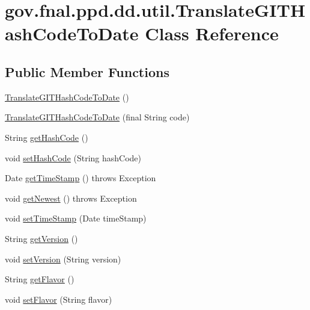 \hypertarget{classgov_1_1fnal_1_1ppd_1_1dd_1_1util_1_1TranslateGITHashCodeToDate}{\section{gov.\-fnal.\-ppd.\-dd.\-util.\-Translate\-G\-I\-T\-Hash\-Code\-To\-Date Class Reference}
\label{classgov_1_1fnal_1_1ppd_1_1dd_1_1util_1_1TranslateGITHashCodeToDate}
}
\subsection*{Public Member Functions}
\begin{DoxyCompactItemize}
\item 
\hyperlink{classgov_1_1fnal_1_1ppd_1_1dd_1_1util_1_1TranslateGITHashCodeToDate_a1f02d5315d989c80fcd1d5eb055fde8e}{Translate\-G\-I\-T\-Hash\-Code\-To\-Date} ()
\item 
\hyperlink{classgov_1_1fnal_1_1ppd_1_1dd_1_1util_1_1TranslateGITHashCodeToDate_a313637f8112acb6a532b8c4f818cedf7}{Translate\-G\-I\-T\-Hash\-Code\-To\-Date} (final String code)
\item 
String \hyperlink{classgov_1_1fnal_1_1ppd_1_1dd_1_1util_1_1TranslateGITHashCodeToDate_a103a33d915679e87ac1f80a2d0842731}{get\-Hash\-Code} ()
\item 
void \hyperlink{classgov_1_1fnal_1_1ppd_1_1dd_1_1util_1_1TranslateGITHashCodeToDate_a6fe4a6f0c0d6a102fa87d3588b17c843}{set\-Hash\-Code} (String hash\-Code)
\item 
Date \hyperlink{classgov_1_1fnal_1_1ppd_1_1dd_1_1util_1_1TranslateGITHashCodeToDate_a579471a2e42dc2cc64b928207d4de457}{get\-Time\-Stamp} ()  throws Exception 
\item 
void \hyperlink{classgov_1_1fnal_1_1ppd_1_1dd_1_1util_1_1TranslateGITHashCodeToDate_abd6899136c0cb2c0d22304f18cd107f3}{get\-Newest} ()  throws Exception 
\item 
void \hyperlink{classgov_1_1fnal_1_1ppd_1_1dd_1_1util_1_1TranslateGITHashCodeToDate_adf8048178fcc5268a5626d523f74c35b}{set\-Time\-Stamp} (Date time\-Stamp)
\item 
String \hyperlink{classgov_1_1fnal_1_1ppd_1_1dd_1_1util_1_1TranslateGITHashCodeToDate_aac0cfb3fc27d10f499c093091b8a2f4d}{get\-Version} ()
\item 
void \hyperlink{classgov_1_1fnal_1_1ppd_1_1dd_1_1util_1_1TranslateGITHashCodeToDate_aa0040b578c3a89616c8c3a314fb149a2}{set\-Version} (String version)
\item 
String \hyperlink{classgov_1_1fnal_1_1ppd_1_1dd_1_1util_1_1TranslateGITHashCodeToDate_ad70da954f52e2ea656323f5e0206d779}{get\-Flavor} ()
\item 
void \hyperlink{classgov_1_1fnal_1_1ppd_1_1dd_1_1util_1_1TranslateGITHashCodeToDate_a981b819800dc5cedff5edc74f2019b12}{set\-Flavor} (String flavor)
\end{DoxyCompactItemize}
